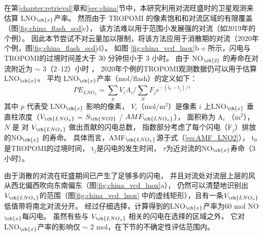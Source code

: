 在第\ref{chapter:retrieval}章和\ref{sec:china}节中，本研究利用对流旺盛时的卫星观测来估算 LNO$_{\ch{x}}$产率。
然而由于 TROPOMI 的像素饱和和对流区域的有限覆盖（图\ref{fig:china_flash_scd}c），
该方法难以用于范围小发展强的对流（如2019年的个例）。
因此本节尝试不对云量加以限制，将该方法应用于消散期的对流（2020年个例，图\ref{fig:china_flash_scd}d）。
如图 \ref{fig:china_vcd_lnox}b--c 所示，闪电与TROPOMI的过境时间差大于 30 分钟但小于 3 小时。
由于 NO$_{\ch{2}}$ 的寿命在对流附近为 $\sim$ 3（2--12）小时 \citep{Nault.2016}，
2020年个例的TROPOMI观测数据仍可以用于估算LNO$_{\ch{x}}$。
平均 LNO$_{\ch{x}}$产率（mol/flash）的定义如下：
\begin{equation} \label{eq:lnox}
PE_{LNO_x} = \sum_{p} V_i A_i / \sum_{N} F_j e^{-(t_0 - t_j) / \tau}
\end{equation}
其中 $p$ 代表受 LNO$_{\ch{x}}$ 影响的像素，
$V_i$（mol/m$^2$）是像素 $i$ 上LNO$_{\ch{x}}$ 垂直柱浓度（$V_{\ch{LNO_x}}$ = $S_{\ch{NO2}}$ / $AMF_{\ch{LNO_x}}$），
面积称为 A$_i$ （m$^2$），
$N$ 是 对 $V_{\ch{LNO_x}}$ 做出贡献的闪电总数，
指数部分考虑了每个闪电（F$_j$）排放的NO$_{\ch{x}}$ 的寿命。
具体而言，AMF$_{\ch{LNO_x}}$源于式（\ref{eq:AMF_LNO2}），
t$_0$是TROPOMI的过境时间，
t$_j$是闪电的发生时间，
$\tau$为近对流的NO$_{\ch{x}}$寿命（3 小时）。

由于消散的对流在旺盛期间已产生了足够多的闪电，
并且对流处对流层上层的风从西北偏西吹向东南偏东（图\ref{fig:china_vcd_lnox}a），
仍然可以清楚地识别出$V_{\ch{LNO_x}}$的范围（图\ref{fig:china_vcd_lnox} 中的虚线矩形），且有一条$V_{\ch{LNO_x}}$低值带将南北对流分开。
经过仔细选择，计算得到的LNO$_{\ch{x}}$产率为60 mol NO$_{\ch{x}}$每闪电。
虽然有些与 $V_{\ch{LNO_x}}$ 相关的闪电在选择的区域之外，
它对LNO$_{\ch{x}}$产率的影响仅 $\sim$ 2 mol，在下节的不确定性评估范围内。




